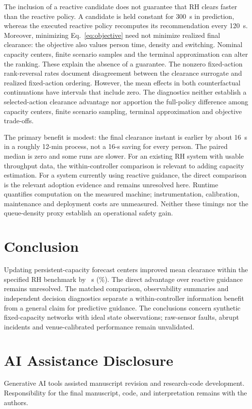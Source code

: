 \documentclass[conference]{IEEEtran}
\begin{document}
The inclusion of a reactive candidate does not guarantee that RH clears faster than the reactive policy. A candidate is held constant for 300~s in prediction, whereas the executed reactive policy recomputes its recommendation every 120~s. Moreover, minimizing Eq.~\eqref{eq:objective} need not minimize realized final clearance: the objective also values person time, density and switching. Nominal capacity centers, finite scenario samples and the terminal approximation can alter the ranking. These explain the absence of a guarantee. The nonzero fixed-action rank-reversal rates document disagreement between the clearance surrogate and realized fixed-action ordering. However, the mean effects in both counterfactual continuations have intervals that include zero. The diagnostics neither establish a selected-action clearance advantage nor apportion the full-policy difference among capacity centers, finite scenario sampling, terminal approximation and objective trade-offs.

The primary benefit is modest: the final clearance instant is earlier by about 16~s in a roughly 12-min process, not a 16-s saving for every person. The paired median is zero and some runs are slower. For an existing RH system with usable throughput data, the within-controller comparison is relevant to adding capacity estimation. For a system currently using reactive guidance, the direct comparison is the relevant adoption evidence and remains unresolved here. Runtime quantifies computation on the measured machine; instrumentation, calibration, maintenance and deployment costs are unmeasured. Neither these timings nor the queue-density proxy establish an operational safety gain.

\section{Conclusion}
Updating persistent-capacity forecast centers improved mean clearance within the specified RH benchmark by \PrimaryReduction~s (\PrimaryReductionPct\%). The direct advantage over reactive guidance remains unresolved. The matched comparison, observability summaries and independent decision diagnostics separate a within-controller information benefit from a general claim for predictive guidance. The conclusions concern synthetic fixed-capacity networks with ideal state observations; raw-sensor faults, abrupt incidents and venue-calibrated performance remain unvalidated.

\section*{AI Assistance Disclosure}
Generative AI tools assisted manuscript revision and research-code development. Responsibility for the final manuscript, code, and interpretation remains with the authors.



\end{document}
